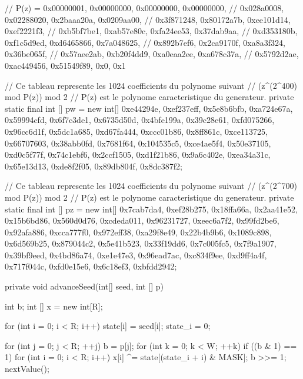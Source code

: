 \begin{code}
\begin{hide}
{   // P(z) = {0x00000001, 0x00000000, 0x00000000, 0x00000000,
   //         0x028a0008, 0x02288020, 0x2baaa20a, 0x0209aa00,
   //         0x3f871248, 0x80172a7b, 0xee101d14, 0xef2221f3,
   //         0xb5bf7be1, 0xab57e80c, 0xfa24ee53, 0x37dab9aa,
   //         0xd353180b, 0xf1c5d9ed, 0xd6465866, 0x7a048625,
   //         0x892b7ef6, 0x2ca9170f, 0xa8a3f324, 0x36be065f,
   //         0x57aee2ab, 0xb20f4dd9, 0xa0eaa2ee, 0xa678c37a,
   //         0x5792d2ae, 0xac449456, 0x51549f89, 0x0, 0x1}

   // Ce tableau represente les 1024 coefficients du polynome suivant
   // (z^(2^400) mod P(z)) mod 2
   // P(z) est le polynome caracteristique du generateur.
   private static final int [] pw = new int[]
                        { 0xe44294e, 0xef237eff, 0x5e8b6bfb, 0xa724e67a,
                         0x59994cfd, 0x6f7c3de1, 0x6735d50d, 0x4bfe199a,
                         0x39c28e61, 0xfd075266, 0x96cc6d1f, 0x5dc1a685,
                         0xd67fa444, 0xccc01b86,  0x8ff861c, 0xce113725,
                         0x66707603, 0x38abb0fd,  0x7681f64, 0x104535c5,
                         0xce4ae5f4, 0x50e37105, 0xd0c5f77f, 0x74c1ebf6,
                         0x2ccf1505, 0xd1f21b86, 0x9a6c402e, 0xea34a31c,
                         0x65e13d13, 0xde8f2f05, 0x89db804f, 0x8dc387f2};

   // Ce tableau represente les 1024 coefficients du polynome suivant
   // (z^(2^700) mod P(z)) mod 2
   // P(z) est le polynome caracteristique du generateur.
   private static final int [] pz = new int[]
                        {0x7cab7da4, 0xef28b275, 0x18ffa66a, 0x2aa41e52,
                         0x15b6bd86, 0x560d0d76, 0xcdeda011, 0x96231727,
                         0xeec6a7f2, 0x99fd2be6, 0x92afa886, 0xcca777f0,
                         0x972eff38, 0xa29f8e49, 0x22b4b9b6, 0x1089c898,
                         0x6d569b25, 0x879044c2, 0x5e41b523, 0x33f19dd6,
                         0x7c005fc5, 0x7f9a1907, 0x39bf9eed, 0x4bd86a74,
                          0xe1e47e3, 0x96ead7ac, 0xc834f9ee, 0xd9ff4a4f,
                         0x717f044c, 0xfd0e15e6,  0x6c18ef3, 0xbfdd2942};



   private void advanceSeed(int[] seed, int [] p) {
      int b;
      int [] x = new int[R];

      for (int i = 0; i < R; i++) {
         state[i] = seed[i];
      }
      state_i = 0;

      for (int j = 0; j < R; ++j) {
         b = p[j];
         for (int k = 0; k < W; ++k) {
            if ((b & 1) == 1) {
               for (int i = 0; i < R; i++) {
                  x[i] ^= state[(state_i + i) & MASK];
               }
            }
            b >>= 1;
            nextValue();
         }
      }

}}
\end{hide}
\end{code}
